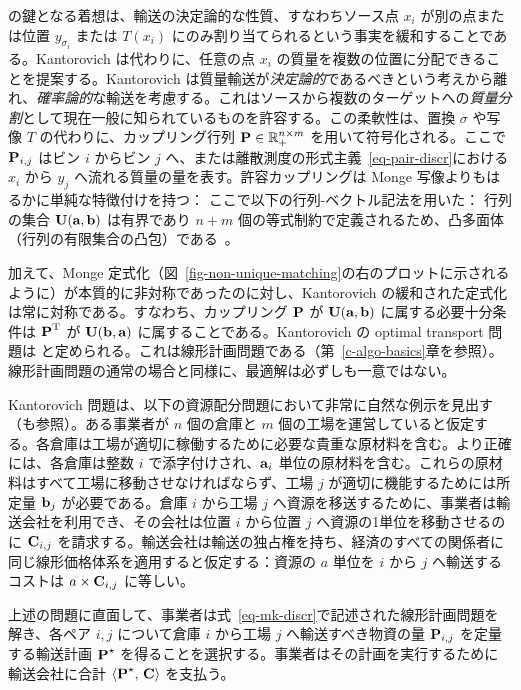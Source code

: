 \citet{Kantorovich42}の鍵となる着想は、輸送の決定論的な性質、すなわちソース点 $x_i$ が別の点または位置 $y_{\sigma_i}$ または $T(x_i)$ にのみ割り当てられるという事実を緩和することである。Kantorovich は代わりに、任意の点 $x_i$ の質量を複数の位置に分配できることを提案する。Kantorovich は質量輸送が\emph{決定論的}であるべきという考えから離れ、\emph{確率論的}な輸送を考慮する。これはソースから複数のターゲットへの\emph{質量分割}として現在一般に知られているものを許容する。この柔軟性は、置換 $\sigma$ や写像 $T$ の代わりに、カップリング行列 $\P  \in \RR_+^{n \times m}$ を用いて符号化される。ここで $\P_{i,j}$ はビン $i$ からビン $j$ へ、または離散測度の形式主義~\eqref{eq-pair-discr}における $x_i$ から $y_j$ へ流れる質量の量を表す。許容カップリングは Monge 写像よりもはるかに単純な特徴付けを持つ：
ここで以下の行列-ベクトル記法を用いた：
行列の集合 $\CouplingsD(\a,\b)$ は有界であり $n+m$ 個の等式制約で定義されるため、凸多面体（行列の有限集合の凸包）である~\citep[\S8.1]{brualdi2006combinatorial}。

%
加えて、Monge 定式化（図~\ref{fig-non-unique-matching}の右のプロットに示されるように）が本質的に非対称であったのに対し、Kantorovich の緩和された定式化は常に対称である。すなわち、カップリング $\P$ が $\CouplingsD(\a,\b)$ に属する必要十分条件は $\transp{\P}$ が $\CouplingsD(\b,\a)$ に属することである。Kantorovich の optimal transport 問題は
と定められる。これは線形計画問題である（第~\ref{c-algo-basics}章を参照）。線形計画問題の通常の場合と同様に、最適解は必ずしも一意ではない。

\begin{rem}[鉱山と工場]\label{rem-kantorovich-primal} Kantorovich 問題は、以下の資源配分問題において非常に自然な例示を見出す（\citet{Hitchcock41}も参照）。ある事業者が $n$ 個の倉庫と $m$ 個の工場を運営していると仮定する。各倉庫は工場が適切に稼働するために必要な貴重な原材料を含む。より正確には、各倉庫は整数 $i$ で添字付けされ、$\a_i$ 単位の原材料を含む。これらの原材料はすべて工場に移動させなければならず、工場 $j$ が適切に機能するためには所定量 $\b_j$ が必要である。倉庫 $i$ から工場 $j$ へ資源を移送するために、事業者は輸送会社を利用でき、その会社は位置 $i$ から位置 $j$ へ資源の1単位を移動させるのに $\C_{i,j}$ を請求する。輸送会社は輸送の独占権を持ち、経済のすべての関係者に同じ線形価格体系を適用すると仮定する：資源の $a$ 単位を $i$ から $j$ へ輸送するコストは $a\times \C_{i,j}$ に等しい。

上述の問題に直面して、事業者は式~\eqref{eq-mk-discr}で記述された線形計画問題を解き、各ペア $i,j$ について倉庫 $i$ から工場 $j$ へ輸送すべき物資の量 $\P_{i,j}$ を定量する輸送計画 $\P^\star$ を得ることを選択する。事業者はその計画を実行するために輸送会社に合計 $\dotp{\P^\star}{\C}$ を支払う。
\end{rem}

